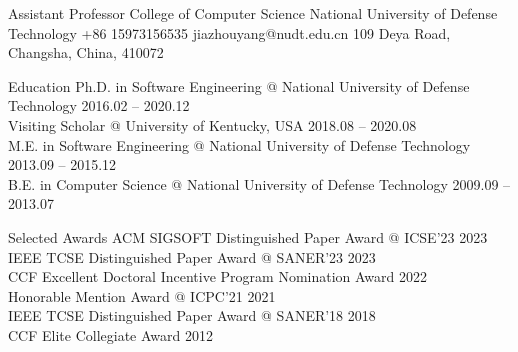 \documentclass{resume}
\begin{document}
\begin{rSubsection}
{Assistant Professor}
{College of Computer Science}
{National University of Defense Technology}
{+86 15973156535}
{jiazhouyang@nudt.edu.cn}
{109 Deya Road, Changsha, China, 410072}
\end{rSubsection}

\begin{rSection}{Education}
{Ph.D. in Software Engineering @ National University of Defense Technology} \hfill {2016.02 -- 2020.12} \\ 
{Visiting Scholar @ University of Kentucky, USA} \hfill {2018.08 -- 2020.08} \\ 
{M.E. in Software Engineering @ National University of Defense Technology} \hfill {2013.09 -- 2015.12} \\ 
{B.E. in Computer Science @ National University of Defense Technology} \hfill {2009.09 -- 2013.07} 
\end{rSection}

\begin{rSection}{Selected Awards}
{ACM SIGSOFT Distinguished Paper Award @ ICSE'23} \hfill {2023} \\ 
{IEEE TCSE Distinguished Paper Award @ SANER'23} \hfill {2023} \\ 
{CCF Excellent Doctoral Incentive Program Nomination Award} \hfill {2022} \\ 
{Honorable Mention Award @ ICPC'21} \hfill {2021} \\ 
{IEEE TCSE Distinguished Paper Award @ SANER'18} \hfill {2018} \\ 
{CCF Elite Collegiate Award} \hfill {2012} \\ 
\end{rSection}
\end{document}
